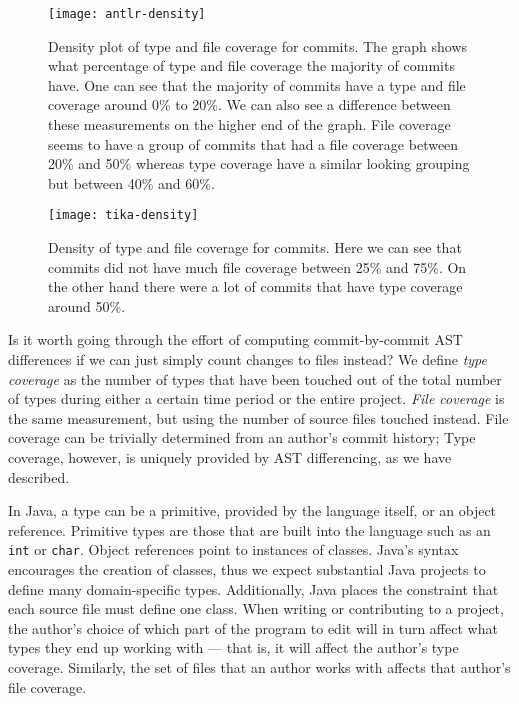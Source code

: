 \begin{figure}[ht]
\centering
\texttt{[image: antlr-density]}
\caption{Density plot of type and file coverage for commits. The graph shows what percentage of type and file coverage the majority of commits have. One can see that the majority of commits have a type and file coverage around 0\% to 20\%. We can also see a difference between these measurements on the higher end of the graph. File coverage seems to have a group of commits that had a file coverage between 20\% and 50\% whereas type coverage have a similar looking grouping but between 40\% and 60\%.}
\end{figure}

\begin{figure}[ht]
\centering
\texttt{[image: tika-density]}
\caption{Density of type and file coverage for commits. Here we can see that commits did not have much file coverage between 25\% and 75\%. On the other hand there were a lot of commits that have type coverage around 50\%.}
\end{figure}

Is it worth going through the effort of computing commit-by-commit AST differences if we can just simply count changes to files instead? We define \emph{type coverage} as the number of types that have been touched out of the total number of types during either a certain time period or the entire project. \emph{File coverage} is the same measurement, but using the number of source files touched instead. File coverage can be trivially determined from an author's commit history; Type coverage, however, is uniquely provided by AST differencing, as we have described.

In Java, a type can be a primitive, provided by the language itself, or an object reference. Primitive types are those that are built into the language such as an \texttt{int} or \texttt{char}. Object references point to instances of classes. Java's syntax encourages the creation of classes, thus we expect substantial Java projects to define many domain-specific types. Additionally, Java places the constraint that each source file must define one class. When writing or contributing to a project, the author's choice of which part of the program to edit will in turn affect what types they end up working with --- that is, it will affect the author's type coverage. Similarly, the set of files that an author works with affects that author's file coverage.

